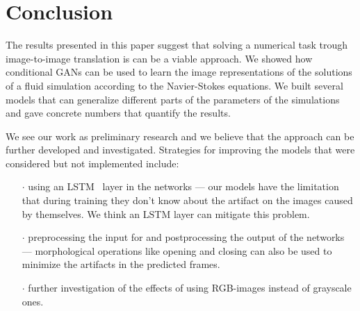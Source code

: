 \documentclass{llncs}
\begin{document}
\section{Conclusion}\label{conclusion}
The results presented in this paper suggest that solving a numerical task trough image-to-image translation is can be a viable approach. We showed how conditional GANs can be used to learn the image representations of the solutions of a fluid simulation according to the Navier-Stokes equations. We built several models that can generalize different parts of the parameters of the simulations and gave concrete numbers that quantify the results.

We see our work as preliminary research and we believe that the approach can be further developed and investigated. Strategies for improving the models that were considered but not implemented include:
\begin{itemize}
\item[$\cdot$] using an LSTM~\cite{lstm} layer in the networks --- our models have the limitation that during training they don't know about the artifact on the images caused by themselves. We think an LSTM layer can mitigate this problem.
\item[$\cdot$] preprocessing the input for and postprocessing the output of the networks --- morphological operations like opening and closing can also be used to minimize the artifacts in the predicted frames.
\item[$\cdot$] further investigation of the effects of using RGB-images instead of grayscale ones. 
\end{itemize}

\clearpage


\end{document}
